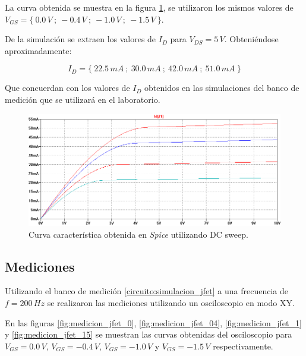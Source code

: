 \documentclass[10pt,spanish,a4paper,notitlepage]{article}
\begin{document}
La curva obtenida se muestra en la figura \ref{fig:simulacion_jfet_dc_sweep}, se utilizaron
los mismos valores de $V_{GS} = \{\ 0.0\,\unit{V}\ ;\ -0.4\,\unit{V}\ ;\ -1.0\,\unit{V}\ ;\ -1.5\,\unit{V}\ \}$.

De la simulación se extraen los valores de $I_D$ para $V_{DS} = 5\,\unit{V}$. Obteniéndose aproximadamente:

\[ \displaystyle I_D = \{\ 22.5\,\unit{mA} \ ;\ 30.0\,\unit{mA} \ ;\ 42.0\,\unit{mA} \ ;\ 51.0\,\unit{mA} \ \} \]

Que concuerdan con los valores de $I_D$ obtenidos en las simulaciones del banco de medición 
que se utilizará en el laboratorio.

\begin{figure}[H]
\centering
\includegraphics[scale=0.45]{simulaciones/2_sim_dcsweep.png}
\caption{Curva característica obtenida en \emph{Spice} utilizando DC sweep.}
\label{fig:simulacion_jfet_dc_sweep}
\end{figure}

\subsection{Mediciones}

Utilizando el banco de medición \ref{circuito:simulacion_jfet} a una frecuencia
de $f = 200\,\unit{Hz}$ se realizaron las mediciones utilizando un osciloscopio
en modo XY.

En las figuras \ref{fig:medicion_jfet_0}, \ref{fig:medicion_jfet_04},
\ref{fig:medicion_jfet_1} y \ref{fig:medicion_jfet_15} se muestran las curvas
obtenidas del osciloscopio para $V_{GS} = 0.0\,\unit{V}$, $V_{GS} = -0.4\,\unit{V}$,
$V_{GS} = -1.0\,\unit{V}$ y $V_{GS} = -1.5\,\unit{V}$ respectivamente.
\end{document}
